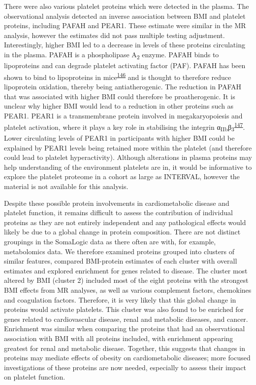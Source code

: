 \documentclass[11pt,twoside]{bristolthesis}
\begin{document}
There were also various platelet proteins which were detected in the plasma. The observational analysis detected an inverse association between BMI and platelet proteins, including PAFAH and PEAR1. These estimate were similar in the MR analysis, however the estimates did not pass multiple testing adjustment. Interestingly, higher BMI led to a decrease in levels of these proteins circulating in the plasma. PAFAH is a phospholipase A\textsubscript{2} enzyme. PAFAH binds to lipoproteins and can degrade platelet activating factor (PAF). PAFAH has been shown to bind to lipoproteins in mice\textsuperscript{\protect\hyperlink{ref-Noto2003}{146}} and is thought to therefore reduce lipoprotein oxidation, thereby being antiatherogenic. The reduction in PAFAH that was associated with higher BMI could therefore be proatherogenic. It is unclear why higher BMI would lead to a reduction in other proteins such as PEAR1. PEAR1 is a transmembrane protein involved in megakaryopoiesis and platelet activation, where it plays a key role in stabilising the integrin α\textsubscript{IIb}β\textsubscript{3}\textsuperscript{\protect\hyperlink{ref-Kauskot2012}{147}}. Lower circulating levels of PEAR1 in participants with higher BMI could be explained by PEAR1 levels being retained more within the platelet (and therefore could lead to platelet hyperactivity). Although alterations in plasma proteins may help understanding of the environment platelets are in, it would be informative to explore the platelet proteome in a cohort as large as INTERVAL, however the material is not available for this analysis.

Despite these possible protein involvements in cardiometabolic disease and platelet function, it remains difficult to assess the contribution of individual proteins as they are not entirely independent and any pathological effects would likely be due to a global change in protein composition. There are not distinct groupings in the SomaLogic data as there often are with, for example, metabolomics data. We therefore examined proteins grouped into clusters of similar features, compared BMI-protein estimates of each cluster with overall estimates and explored enrichment for genes related to disease. The cluster most altered by BMI (cluster 2) included most of the eight proteins with the strongest BMI effects from MR analyses, as well as various complement factors, chemokines and coagulation factors. Therefore, it is very likely that this global change in proteins would activate platelets. This cluster was also found to be enriched for genes related to cardiovascular disease, renal and metabolic diseases, and cancer. Enrichment was similar when comparing the proteins that had an observational association with BMI with all proteins included, with enrichment appearing greatest for renal and metabolic disease. Together, this suggests that changes in proteins may mediate effects of obesity on cardiometabolic diseases; more focused investigations of these proteins are now needed, especially to assess their impact on platelet function.
\end{document}

